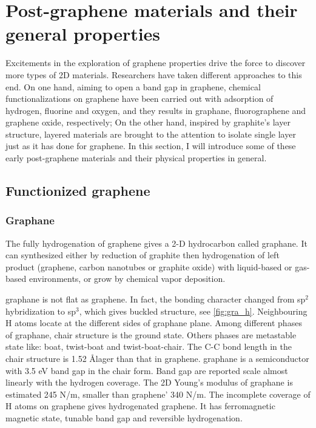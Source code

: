 \section{Post-graphene materials and their general properties}

Excitements in the exploration of graphene properties drive the force to discover more types of 2D materials. Researchers have taken different approaches to this end. On one hand, aiming to open a band gap in graphene, chemical functionalizations on graphene have been carried out with adsorption of hydrogen, fluorine and oxygen, and they results in graphane, fluorographene and graphene oxide, respectively; On the other hand, inspired by graphite's layer structure, layered materials are brought to the attention to isolate single layer just as it has done for graphene. In this section, I will introduce some of these early post-graphene materials and their physical properties in general.

\subsection{Functionized graphene}

\subsubsection{Graphane}

The fully hydrogenation of graphene gives a 2-D hydrocarbon called graphane. It can synthesized either by reduction of graphite then hydrogenation of left product (graphene, carbon nanotubes or graphite oxide) with liquid-based\cite{Yang2012} or gas-based\cite{Burgess2011} environments, or grow by chemical vapor deposition\cite{wang2010}. 

graphane is not flat as graphene. In fact, the bonding character changed from sp$^2$ hybridization to sp$^3$, which gives buckled structure, see \autoref{fig:gra_h}. Neighbouring H atoms locate at the different sides of graphane plane. Among different phases of graphane, chair structure is the ground state. Others phases are metastable state like: boat, twist-boat and twist-boat-chair\cite{Samarakoon2009}. The C-C bond length in the chair structure is 1.52 \AA lager than that in graphene. graphane is a semiconductor with 3.5 eV band gap in the chair form. Band gap are reported scale almost linearly with the hydrogen coverage\cite{Ilyin2011}. The 2D Young's modulus of graphane is estimated 245 \si{N/m}\cite{Munoz2010}, smaller than graphene' 340 \si{N/m}. The incomplete coverage of H atoms on graphene gives hydrogenated graphene. It has ferromagnetic magnetic state\cite{Zhou2009}, tunable band gap\cite{Shkrebtii2011} and reversible hydrogenation\cite{Elias2009}. 

